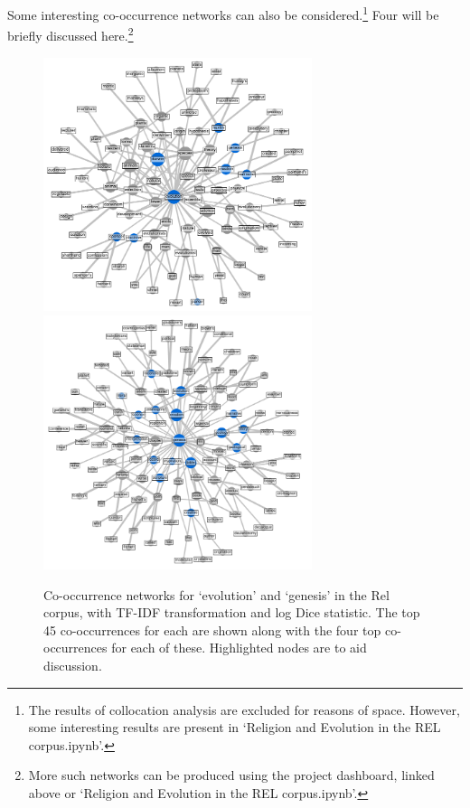 \documentclass{article}
\begin{document}
Some interesting co-occurrence networks can also be considered.\footnote{The results of collocation analysis are excluded for reasons of space. However, some interesting results are present in `Religion and Evolution in the REL corpus.ipynb'.} Four will be briefly discussed here.\footnote{More such networks can be produced using the project dashboard, linked above or `Religion and Evolution in the REL corpus.ipynb'.}

\begin{figure}
    \centering
    \includegraphics[width=0.7\textwidth]{images/evo_network_main.png}
    \includegraphics[width=0.7\textwidth]{images/genesis_main.png}
    \caption{\footnotesize{Co-occurrence networks for `evolution' and `genesis' in the Rel corpus, with TF-IDF transformation and log Dice statistic. The top 45 co-occurrences for each are shown along with the four top co-occurrences for each of these. Highlighted nodes are to aid discussion.}}
    \label{f:evo-net}
\end{figure}
\end{document}
